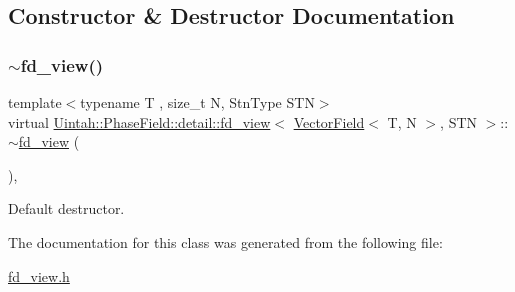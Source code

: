 \subsection{Constructor \& Destructor Documentation}
\mbox{\label{classUintah_1_1PhaseField_1_1detail_1_1fd__view_3_01VectorField_3_01T_00_01N_01_4_00_01STN_01_4_a7d8e9e947814c68b5cb5d24f08bd6aa5}} 
\subsubsection{\texorpdfstring{$\sim$fd\+\_\+view()}{~fd\_view()}}
{\footnotesize\ttfamily template$<$typename T , size\+\_\+t N, Stn\+Type S\+TN$>$ \\
virtual \hyperlink{classUintah_1_1PhaseField_1_1detail_1_1fd__view}{Uintah\+::\+Phase\+Field\+::detail\+::fd\+\_\+view}$<$ \hyperlink{structUintah_1_1PhaseField_1_1VectorField}{Vector\+Field}$<$ T, N $>$, S\+TN $>$\+::$\sim$\hyperlink{classUintah_1_1PhaseField_1_1detail_1_1fd__view}{fd\+\_\+view} (\begin{DoxyParamCaption}{ }\end{DoxyParamCaption})\hspace{0.3cm}{\ttfamily [virtual]}, {\ttfamily [default]}}



Default destructor. 



The documentation for this class was generated from the following file\+:\begin{DoxyCompactItemize}
\item 
\hyperlink{fd__view_8h}{fd\+\_\+view.\+h}\end{DoxyCompactItemize}
